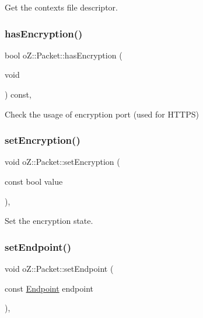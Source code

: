 Get the context\textquotesingle{}s file descriptor. 

\mbox{\label{classo_z_1_1_packet_abf9bd4979afb439272832d5a90f7d556}} 
\subsubsection{\texorpdfstring{hasEncryption()}{hasEncryption()}}
{\footnotesize\ttfamily bool o\+Z\+::\+Packet\+::has\+Encryption (\begin{DoxyParamCaption}\item[{void}]{ }\end{DoxyParamCaption}) const\hspace{0.3cm}{\ttfamily [inline]}, {\ttfamily [noexcept]}}



Check the usage of encryption port (used for H\+T\+T\+PS) 

\mbox{\label{classo_z_1_1_packet_a7c6fc3f9ca25adf83be8e7c1f5ae5b70}} 
\subsubsection{\texorpdfstring{setEncryption()}{setEncryption()}}
{\footnotesize\ttfamily void o\+Z\+::\+Packet\+::set\+Encryption (\begin{DoxyParamCaption}\item[{const bool}]{value }\end{DoxyParamCaption})\hspace{0.3cm}{\ttfamily [inline]}, {\ttfamily [noexcept]}}



Set the encryption state. 

\mbox{\label{classo_z_1_1_packet_a2bcd9f2d612cbc1b59a8b7c99d706908}} 
\subsubsection{\texorpdfstring{setEndpoint()}{setEndpoint()}}
{\footnotesize\ttfamily void o\+Z\+::\+Packet\+::set\+Endpoint (\begin{DoxyParamCaption}\item[{const \mbox{\hyperlink{classo_z_1_1_endpoint}{Endpoint}}}]{endpoint }\end{DoxyParamCaption})\hspace{0.3cm}{\ttfamily [inline]}, {\ttfamily [noexcept]}}



